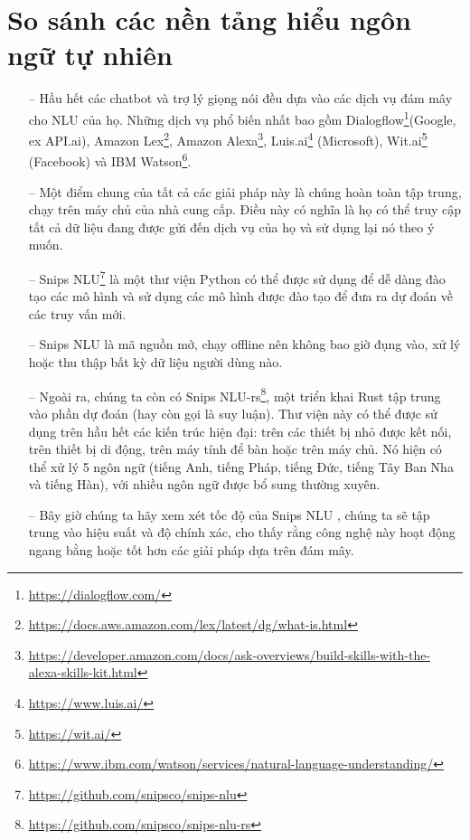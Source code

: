 \section{So sánh các nền tảng hiểu ngôn ngữ tự nhiên}

\begin{itemize}
    \item[--] 	Hầu hết các chatbot và trợ lý giọng nói đều dựa vào các dịch vụ đám mây cho NLU của họ. Những dịch vụ phổ biến nhất bao gồm Dialogflow\footnote{\url{https://dialogflow.com/}}(Google, ex API.ai), Amazon Lex\footnote{\url{https://docs.aws.amazon.com/lex/latest/dg/what-is.html}}, Amazon Alexa\footnote{\url{https://developer.amazon.com/docs/ask-overviews/build-skills-with-the-alexa-skills-kit.html}}, Luis.ai\footnote{\url{https://www.luis.ai/}} (Microsoft), Wit.ai\footnote{\url{https://wit.ai/}} (Facebook) và IBM Watson\footnote{\url{https://www.ibm.com/watson/services/natural-language-understanding/}}.
    \item[--] Một điểm chung của tất cả các giải pháp này là chúng hoàn toàn tập trung, chạy trên máy chủ của nhà cung cấp. Điều này có nghĩa là họ có thể truy cập tất cả dữ liệu đang được gửi đến dịch vụ của họ và sử dụng lại nó theo ý muốn.
    \item[--] Snips NLU\footnote{\url{https://github.com/snipsco/snips-nlu}} là một thư viện Python có thể được sử dụng để dễ dàng đào tạo các mô hình và sử dụng các mô hình được đào tạo để đưa ra dự đoán về các truy vấn mới.

    \item[--] Snips NLU là mã nguồn mở, chạy offline nên không bao giờ đụng vào, xử lý hoặc thu thập bất kỳ dữ liệu người dùng nào.

    \item[--] Ngoài ra, chúng ta còn có Snips NLU-rs\footnote{\url{https://github.com/snipsco/snips-nlu-rs}}, một triển khai Rust tập trung vào phần dự đoán (hay còn gọi là suy luận). Thư viện này có thể được sử dụng trên hầu hết các kiến trúc hiện đại: trên các thiết bị nhỏ được kết nối, trên thiết bị di động, trên máy tính để bàn hoặc trên máy chủ. Nó hiện có thể xử lý 5 ngôn ngữ (tiếng Anh, tiếng Pháp, tiếng Đức, tiếng Tây Ban Nha và tiếng Hàn), với nhiều ngôn ngữ được bổ sung thường xuyên.
    \item[--] Bây giờ chúng ta hãy xem xét tốc độ của Snips NLU , chúng ta sẽ tập trung vào hiệu suất và độ chính xác, cho thấy rằng công nghệ này hoạt động ngang bằng hoặc tốt hơn các giải pháp dựa trên đám mây.


\end{itemize}
